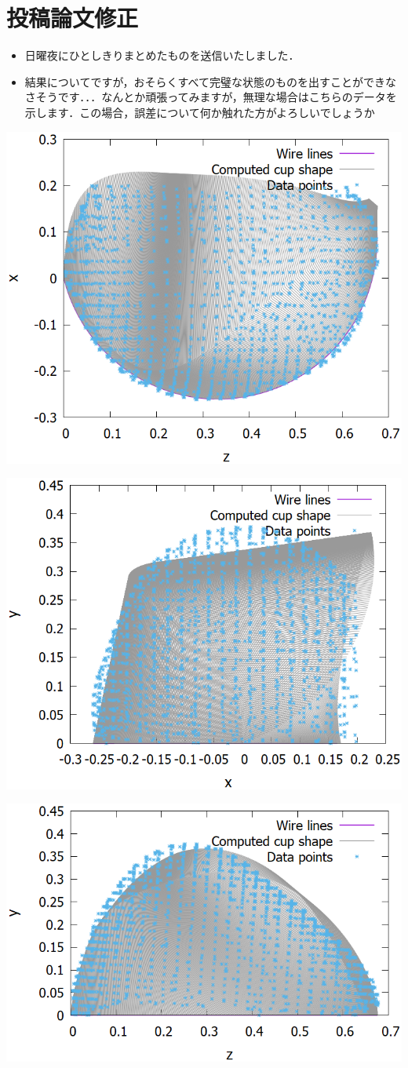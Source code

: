 \documentclass[11pt]{jsarticle}
\begin{document}
	\section{投稿論文修正}
		\begin{itemize}
			\item 日曜夜にひとしきりまとめたものを送信いたしました．
			\item 結果についてですが，おそらくすべて完璧な状態のものを出すことができなさそうです．．．なんとか頑張ってみますが，無理な場合はこちらのデータを示します．この場合，誤差について何か触れた方がよろしいでしょうか
		\end{itemize}
	\bfig[H]
		\centering
		\includegraphics[width=0.6\columnwidth]{./figure/Measure/ObtainedRidgeLinefromz-x.png}
		\caption{z-x}
	\efig
	\bfig[H]
	\centering
	\includegraphics[width=0.6\columnwidth]{./figure/Measure/ObtainedRidgeLinefromx-y.png}
	\caption{x-y}
	\efig
	
	\bfig[H]
	\centering
	\includegraphics[width=0.6\columnwidth]{./figure/Measure/ObtainedRidgeLinefromz-y.png}
	\caption{z-y}
	\efig
	
\end{document}
